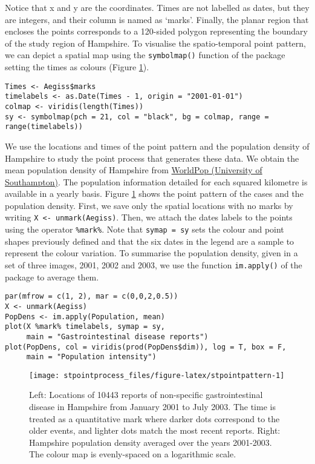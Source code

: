 Notice that x and y are the coordinates. Times are not labelled as dates, but they are integers, and their column is named as `marks'. Finally, the planar region that encloses the points corresponds to a 120-sided polygon representing the boundary of the study region of Hampshire. To visualise the spatio-temporal point pattern, we can depict a spatial map using the \texttt{symbolmap()} function of the  package setting the times as colours (Figure \ref{fig:stpointpattern}).

\begin{verbatim}
Times <- Aegiss$marks
timelabels <- as.Date(Times - 1, origin = "2001-01-01")
colmap <- viridis(length(Times))
sy <- symbolmap(pch = 21, col = "black", bg = colmap, range = range(timelabels))
\end{verbatim}

We use the locations and times of the point pattern and the population density of Hampshire to study the point process that generates these data. We obtain the mean population density of Hampshire from \href{https://www.worldpop.org/}{WorldPop (University of Southampton)}. The population information detailed for each squared kilometre is available in a yearly basis. Figure \ref{fig:stpointpattern} shows the point pattern of the cases and the population density. First, we save only the spatial locations with no marks by writing \texttt{X\ \textless{}-\ unmark(Aegiss)}. Then, we attach the dates labels to the points using the operator \texttt{\%mark\%}. Note that \texttt{symap\ =\ sy} sets the colour and point shapes previously defined and that the six dates in the legend are a sample to represent the colour variation. To summarise the population density, given in a set of three images, 2001, 2002 and 2003, we use the function \texttt{im.apply()} of the package  to average them.

\begin{verbatim}
par(mfrow = c(1, 2), mar = c(0,0,2,0.5)) 
X <- unmark(Aegiss)
PopDens <- im.apply(Population, mean)
plot(X %mark% timelabels, symap = sy, 
     main = "Gastrointestinal disease reports")
plot(PopDens, col = viridis(prod(PopDens$dim)), log = T, box = F,
     main = "Population intensity")
\end{verbatim}

\begin{figure}

{\centering \texttt{[image: stpointprocess\_files/figure-latex/stpointpattern-1]} 

}

\caption{Left: Locations of 10443 reports of non-specific gastrointestinal disease in Hampshire from January 2001 to July 2003. The time is treated as a quantitative mark where darker dots correspond to the older events, and lighter dots match the most recent reports. Right: Hampshire population density averaged over the years 2001-2003. The colour map is evenly-spaced on a logarithmic scale.}\label{fig:stpointpattern}
\end{figure}

